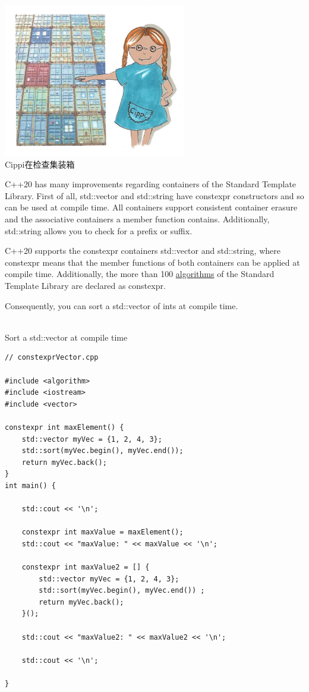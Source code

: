 \begin{center}
\includegraphics[width=0.6\textwidth]{content/3/chapter5/images/10.png}\\
Cippi在检查集装箱
\end{center}

C++20 has many improvements regarding containers of the Standard Template Library. First of all, std::vector and std::string have constexpr constructors and so can be used at compile time. All containers support consistent container erasure and the associative containers a member function contains. Additionally, std::string allows you to check for a prefix or suffix.


C++20 supports the constexpr containers std::vector and std::string, where constexpr means that the member functions of both containers can be applied at compile time. Additionally, the more than 100 \href{https://en.cppreference.com/w/cpp/algorithm}{algorithms} of the Standard Template Library are declared as constexpr.

Consequently, you can sort a std::vector of ints at compile time.

\hspace*{\fill} \\ %
\noindent
Sort a std::vector at compile time
\begin{lstlisting}[style=styleCXX]
// constexprVector.cpp

#include <algorithm>
#include <iostream>
#include <vector>

constexpr int maxElement() {
	std::vector myVec = {1, 2, 4, 3};
	std::sort(myVec.begin(), myVec.end());
	return myVec.back();
}
int main() {

	std::cout << '\n';
	
	constexpr int maxValue = maxElement();
	std::cout << "maxValue: " << maxValue << '\n';
	
	constexpr int maxValue2 = [] {
		std::vector myVec = {1, 2, 4, 3};
		std::sort(myVec.begin(), myVec.end()) ;
		return myVec.back();
	}();
	
	std::cout << "maxValue2: " << maxValue2 << '\n';
	
	std::cout << '\n';

}
\end{lstlisting}

